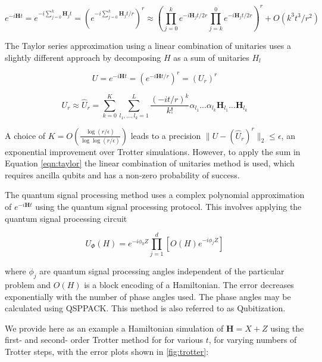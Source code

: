 \documentclass{article}
\begin{document}
\begin{equation}
e^{-i \mathbf{H} t} = e^{ -i \sum_{j=0}^{k}\mathbf{H}_j t } = (e^{ -i \sum_{j=0}^{k}\mathbf{H}_j t / r})^r \approx   (\prod_{j=0}^{k} e^{-i \mathbf{H}_j t / 2r }\prod_{j=k}^{0} e^{-i \mathbf{H}_j t / 2r })^r + O(k^3 t^3 / r^2)
\end{equation}


The Taylor series approximation using a linear combination of unitaries uses a slightly different approach by decomposing $H$ as a sum of unitaries $H_l$

\begin{equation}
U = e^{-i \mathbf{H} t}  = ( e^{-i \mathbf{H} t/r} )^r = (U_r)^r
\end{equation}

\begin{equation}
U_r  \approx \hat U_r = \sum_{k=0}^{K} \sum_{l_1,...,l_k=1}^{L} \frac{(-it/r)^k}{k!} \alpha_{l_1} ... \alpha_{l_k} \mathbf{H}_{l_1} ... \mathbf{H}_{l_k} 
\label{eqn:taylor}
\end{equation}

A choice of $K = O(\frac{\log(r/\epsilon)}{\log \log (r/\epsilon)})$ leads to a precision $\lVert U - (\hat U_r)^r \rVert _2 \leq \epsilon$, an exponential improvement over Trotter simulations. However, to apply the sum in Equation \ref{eqn:taylor} the linear combination of unitaries method is used, which requires ancilla qubits and has a non-zero probability of success.

The quantum signal processing method uses a complex polynomial approximation of $e^{-i \mathbf{H} t}$ using the quantum signal processing protocol. This involves applying the quantum signal processing circuit 

\begin{equation}
U_\Phi (H) = e^{-i\phi_0 Z} \prod_{j=1}^{d} [O(H) e^{-i\phi_j Z}]
\end{equation}

where $\phi_j$ are quantum signal processing angles independent of the particular problem and $O(H)$ is a block encoding of a Hamiltonian. The error decreases exponentially with the number of phase angles used. The phase angles may be calculated using QSPPACK. This method is also referred to as Qubitization.


We provide here as an example a Hamiltonian simulation of  $\mathbf{H} = X + Z$ using the first- and second- order Trotter method for for various $t$, for varying numbers of Trotter steps, with the error plots shown in \ref{fig:trotter}:
\end{document}
